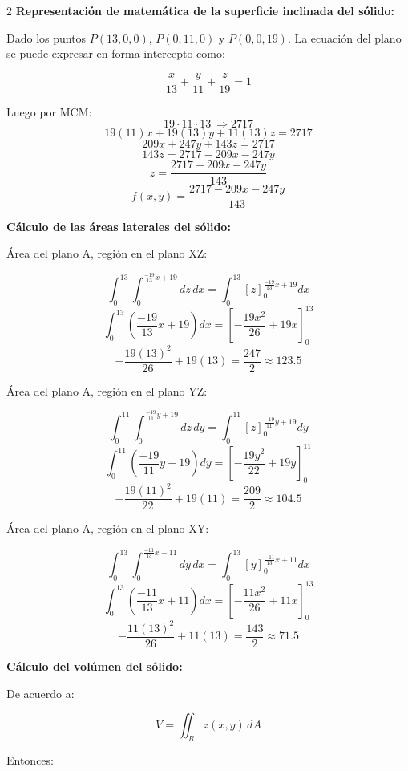\begin{multicols}{2}
\textbf{Representación de matemática de la superficie inclinada del sólido:}

Dado los puntos $P(13,0,0)$, $P(0,11,0)$ y $P(0,0,19)$. La ecuación del plano se puede expresar en forma intercepto como:

\[\frac{x}{13}+\frac{y}{11}+\frac{z}{19}=1\]

Luego por MCM:
\[19 \cdot 11 \cdot 13\ \Rightarrow 2717\]
\[19(11)x + 19(13)y + 11(13)z = 2717\]
\[209x + 247y + 143z = 2717\]
\[143z=2717-209x-247y\]
\[z=\frac{2717-209x-247y}{143}\]
\[f(x,y)=\frac{2717-209x-247y}{143}\]

\textbf{Cálculo de las áreas laterales del sólido:}

Área del plano A, región en el plano XZ:

\[\int_0^{13} \int_0^{\frac{-19}{13}x+19} dz\,dx = \int_0^{13} \left[ z \right]_0^{\frac{-19}{13}x+19} dx\]
\[\int_0^{13} \left( \frac{-19}{13}x+19 \right) dx = \left[ -\frac{19x^2}{26} + 19x \right]_0^{13}\]
\[-\frac{19(13)^2}{26} + 19(13) = \frac{247}{2} \approx 123.5\]

Área del plano A, región en el plano YZ:

\[\int_0^{11} \int_0^{\frac{-19}{11}y+19} dz\,dy = \int_0^{11} \left[ z \right]_0^{\frac{-19}{11}y+19} dy\]
\[\int_0^{11} \left( \frac{-19}{11}y+19 \right) dy = \left[ -\frac{19y^2}{22} + 19y \right]_0^{11}\]
\[-\frac{19(11)^2}{22} + 19(11) = \frac{209}{2} \approx 104.5\]

Área del plano A, región en el plano XY:

\[\int_0^{13} \int_0^{\frac{-11}{13}x+11} dy\,dx = \int_0^{13} \left[ y \right]_0^{\frac{-11}{13}x+11} dx\]
\[\int_0^{13} \left( \frac{-11}{13}x+11 \right) dx = \left[ -\frac{11x^2}{26} + 11x \right]_0^{13}\]
\[-\frac{11(13)^2}{26} + 11(13) = \frac{143}{2} \approx 71.5\]
\end{multicols}

\textbf{Cálculo del volúmen del sólido:}

De acuerdo a:

\[
V=\iint_{R} z(x,y)\,dA
\]

Entonces:

